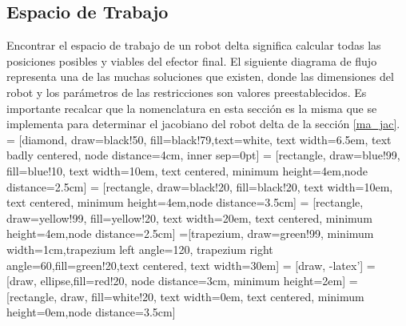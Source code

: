         \newpage

        \newpage

        
    \subsection{Espacio de Trabajo}\label{espaciotrabajows1}
     Encontrar el espacio de trabajo de un robot delta significa calcular todas las posiciones posibles y viables del efector final. El siguiente diagrama de flujo representa una de las muchas soluciones que existen, donde las dimensiones del robot y los parámetros de las restricciones son valores preestablecidos. Es importante recalcar que la nomenclatura en esta sección es la misma que se implementa para determinar el jacobiano del robot delta de la sección \eqref{ma_jac}. 
 = [diamond, draw=black!50, fill=black!79,text=white, 
    text width=6.5em, text badly centered, node distance=4cm, inner sep=0pt]
 = [rectangle, draw=blue!99, fill=blue!10, 
    text width=10em, text centered,   minimum height=4em,node distance=2.5cm]
 = [rectangle, draw=black!20, fill=black!20, 
    text width=10em, text centered,   minimum height=4em,node distance=3.5cm]
 = [rectangle, draw=yellow!99, fill=yellow!20, 
    text width=20em, text centered,   minimum height=4em,node distance=2.5cm]
=[trapezium, draw=green!99, minimum width=1cm,trapezium left angle=120, trapezium right angle=60,fill=green!20,text centered, text width=30em]
 = [draw, -latex']
 = [draw, ellipse,fill=red!20, node distance=3cm, minimum height=2em]
 = [rectangle, draw, fill=white!20, 
    text width=0em, text centered,   minimum height=0em,node distance=3.5cm]
